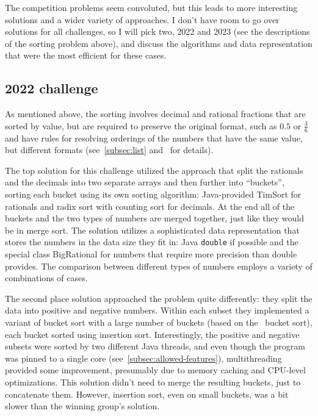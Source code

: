 \documentclass[12pt]{article}
\begin{document}
The competition problems seem convoluted, but this leads to more interesting solutions and a wider variety of approaches. I don't have room to go over solutions for all challenges,
so I will pick two, 2022 and 2023 (see the descriptions of the sorting problem above), and discuss the algorithms and data representation that were the most efficient for these cases. 
 
\subsection{2022 challenge}\label{subsec:2022}
As mentioned above, the sorting involves decimal and rational fractions that are sorted by value, but are required to preserve the original format, such as $0.5$ or $\frac{3}{6}$ and have rules for resolving orderings of the numbers that have the same value, but different formats (see~\ref{subsec:list} and~\cite{sorting2022} for details).  

The top solution for this challenge utilized the approach that split the rationals and the decimals into two separate arrays and then further into ``buckets'', sorting each bucket using its own sorting algorithm: Java-provided TimSort for rationals and radix sort with counting sort for decimals. At the end all of the buckets and the two types of numbers are merged together, just like they would be in merge sort. The solution utilizes a sophisticated data representation that stores the numbers in the data size they fit in: Java \texttt{double} if possible and the special class BigRational for numbers that require more precision than double provides. The comparison between different types of numbers employs a variety of combinations of cases. 

The second place solution approached the problem quite differently: they split the data into positive and negative numbers. Within each subset they implemented a variant of bucket sort with a large number of buckets (based on the~\cite{CLRS} bucket sort), each bucket sorted using insertion sort. Interestingly, the positive and negative subsets were sorted by two different Java threads, and even though the program was pinned to a single core (see~\ref{subsec:allowed-features}), multithreading provided some improvement, presumably due to memory caching and CPU-level optimizations. This solution didn't need to merge the resulting buckets, just to concatenate them.  However, insertion sort, even on small buckets, was a bit slower than the winning group's solution. 
\end{document}
